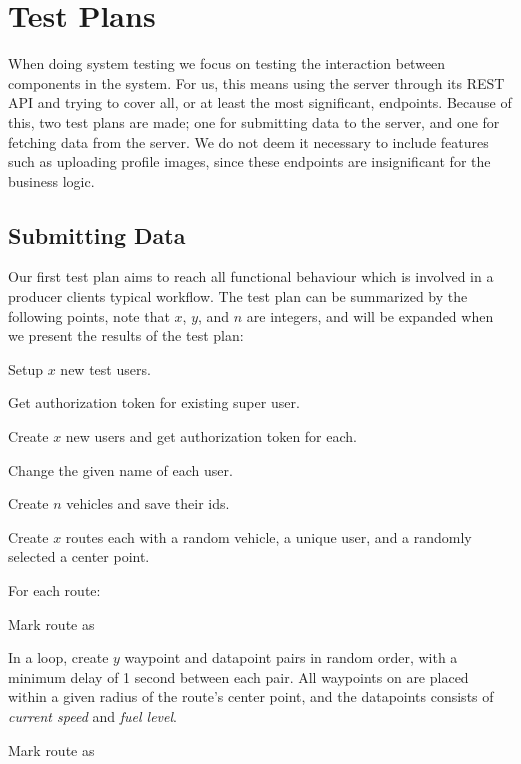\section{Test Plans}
When doing system testing we focus on testing the interaction between components in the system.
For us, this means using the server through its REST API and trying to cover all, or at least the most significant, endpoints.
Because of this, two test plans are made; one for submitting data to the server, and one for fetching data from the server.
We do not deem it necessary to include features such as uploading profile images, since these endpoints are insignificant for the business logic.

\subsection{Submitting Data}
Our first test plan aims to reach all functional behaviour which is involved in a producer clients typical workflow.
The test plan can be summarized by the following points, note that $x$, $y$, and $n$ are integers, and will be expanded when we present the results of the test plan:
\begin{enumberate}
    \item Setup $x$ new test users.
    \begin{enumberate}
        \item Get authorization token for existing super user.
        \item Create $x$ new users and get authorization token for each.
        \item Change the given name of each user.
    \end{enumberate}
    \item Create $n$ vehicles and save their ids.
    \item Create $x$ routes each with a random vehicle, a unique user, and a randomly selected a center point.
    \item For each route:
    \begin{enumberate}
        \item Mark route as 
        \item In a loop, create $y$ waypoint and datapoint pairs in random order, with a minimum delay of 1 second between each pair.
              All waypoints on are placed within a given radius of the route's center point, and the datapoints consists of \textit{current speed} and \textit{fuel level}.
        \item Mark route as 
    \end{enumberate}
\end{enumberate}

